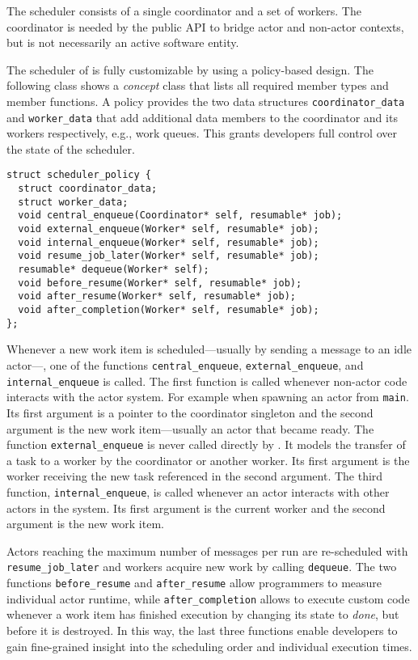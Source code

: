 The scheduler consists of a single coordinator and a set of workers. The
coordinator is needed by the public API to bridge actor and non-actor contexts,
but is not necessarily an active software entity.

The scheduler of \lib is fully customizable by using a policy-based design. The
following class shows a \emph{concept} class that lists all required member
types and member functions. A policy provides the two data structures
\lstinline^coordinator_data^ and \lstinline^worker_data^ that add additional
data members to the coordinator and its workers respectively, e.g., work
queues. This grants developers full control over the state of the scheduler.

\begin{lstlisting}
struct scheduler_policy {
  struct coordinator_data;
  struct worker_data;
  void central_enqueue(Coordinator* self, resumable* job);
  void external_enqueue(Worker* self, resumable* job);
  void internal_enqueue(Worker* self, resumable* job);
  void resume_job_later(Worker* self, resumable* job);
  resumable* dequeue(Worker* self);
  void before_resume(Worker* self, resumable* job);
  void after_resume(Worker* self, resumable* job);
  void after_completion(Worker* self, resumable* job);
};
\end{lstlisting}

Whenever a new work item is scheduled---usually by sending a message to an idle
actor---, one of the functions \lstinline^central_enqueue^,
\lstinline^external_enqueue^, and \lstinline^internal_enqueue^ is called. The
first function is called whenever non-actor code interacts with the actor
system. For example when spawning an actor from \lstinline^main^. Its first
argument is a pointer to the coordinator singleton and the second argument is
the new work item---usually an actor that became ready. The function
\lstinline^external_enqueue^ is never called directly by \lib. It models the
transfer of a task to a worker by the coordinator or another worker. Its first
argument is the worker receiving the new task referenced in the second
argument. The third function, \lstinline^internal_enqueue^, is called whenever
an actor interacts with other actors in the system. Its first argument is the
current worker and the second argument is the new work item.

Actors reaching the maximum number of messages per run are re-scheduled with
\lstinline^resume_job_later^ and workers acquire new work by calling
\lstinline^dequeue^. The two functions \lstinline^before_resume^ and
\lstinline^after_resume^ allow programmers to measure individual actor runtime,
while \lstinline^after_completion^ allows to execute custom code whenever a
work item has finished execution by changing its state to \emph{done}, but
before it is destroyed. In this way, the last three functions enable developers
to gain fine-grained insight into the scheduling order and individual execution
times.

